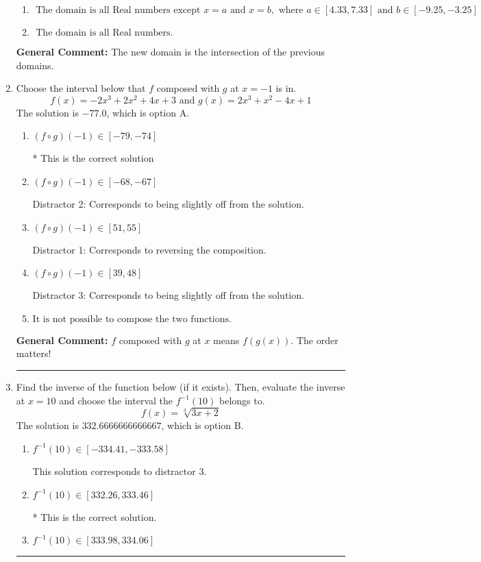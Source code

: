 \documentclass{extbook}[14pt]
\newcommand{\litem}[1]{\item #1

\rule{\textwidth}{0.4pt}}
\begin{document}
\begin{enumerate}
{\begin{enumerate}[label=\Alph*.]
\item \( \text{ The domain is all Real numbers except } x = a \text{ and } x = b, \text{ where } a \in [4.33, 7.33] \text{ and } b \in [-9.25, -3.25] \)


\item \( \text{ The domain is all Real numbers. } \)


\end{enumerate}

\textbf{General Comment:} The new domain is the intersection of the previous domains.
}
\litem{
Choose the interval below that $f$ composed with $g$ at $x=-1$ is in.
\[ f(x) = -2x^{3} +2 x^{2} +4 x + 3 \text{ and } g(x) = 2x^{3} + x^{2} -4 x + 1 \]The solution is \( -77.0 \), which is option A.\begin{enumerate}[label=\Alph*.]
\item \( (f \circ g)(-1) \in [-79, -74] \)

* This is the correct solution
\item \( (f \circ g)(-1) \in [-68, -67] \)

 Distractor 2: Corresponds to being slightly off from the solution.
\item \( (f \circ g)(-1) \in [51, 55] \)

 Distractor 1: Corresponds to reversing the composition.
\item \( (f \circ g)(-1) \in [39, 48] \)

 Distractor 3: Corresponds to being slightly off from the solution.
\item \( \text{It is not possible to compose the two functions.} \)


\end{enumerate}

\textbf{General Comment:} $f$ composed with $g$ at $x$ means $f(g(x))$. The order matters!
}
\litem{
Find the inverse of the function below (if it exists). Then, evaluate the inverse at $x = 10$ and choose the interval the $f^{-1}(10)$ belongs to.
\[ f(x) = \sqrt[3]{3 x + 2} \]The solution is \( 332.6666666666667 \), which is option B.\begin{enumerate}[label=\Alph*.]
\item \( f^{-1}(10) \in [-334.41, -333.58] \)

 This solution corresponds to distractor 3.
\item \( f^{-1}(10) \in [332.26, 333.46] \)

* This is the correct solution.
\item \( f^{-1}(10) \in [333.98, 334.06] \)


\end{enumerate}}
\end{enumerate}
\end{document}
